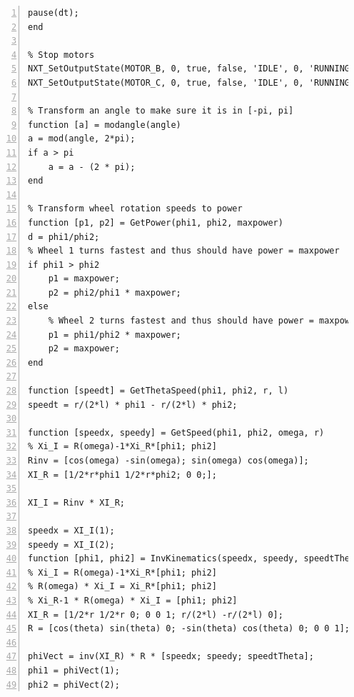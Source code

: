 \documentclass[a4paper]{article}
\begin{document}
\begin{lstlisting}[caption= Kinematica met feedback code, label=lst:bocht, numbers=left]
	pause(dt);
end

% Stop motors
NXT_SetOutputState(MOTOR_B, 0, true, false, 'IDLE', 0, 'RUNNING',  0, 'dontreply');
NXT_SetOutputState(MOTOR_C, 0, true, false, 'IDLE', 0, 'RUNNING',  0, 'dontreply');

% Transform an angle to make sure it is in [-pi, pi]
function [a] = modangle(angle)
a = mod(angle, 2*pi);
if a > pi
    a = a - (2 * pi);
end

% Transform wheel rotation speeds to power
function [p1, p2] = GetPower(phi1, phi2, maxpower)
d = phi1/phi2;
% Wheel 1 turns fastest and thus should have power = maxpower
if phi1 > phi2
	p1 = maxpower;
	p2 = phi2/phi1 * maxpower;
else
    % Wheel 2 turns fastest and thus should have power = maxpower
	p1 = phi1/phi2 * maxpower;
	p2 = maxpower;
end

function [speedt] = GetThetaSpeed(phi1, phi2, r, l)
speedt = r/(2*l) * phi1 - r/(2*l) * phi2;

function [speedx, speedy] = GetSpeed(phi1, phi2, omega, r)
% Xi_I = R(omega)-1*Xi_R*[phi1; phi2]
Rinv = [cos(omega) -sin(omega); sin(omega) cos(omega)];
XI_R = [1/2*r*phi1 1/2*r*phi2; 0 0;];

XI_I = Rinv * XI_R;

speedx = XI_I(1);
speedy = XI_I(2);
function [phi1, phi2] = InvKinematics(speedx, speedy, speedtTheta, theta, r, l)
% Xi_I = R(omega)-1*Xi_R*[phi1; phi2]
% R(omega) * Xi_I = Xi_R*[phi1; phi2]
% Xi_R-1 * R(omega) * Xi_I = [phi1; phi2]
XI_R = [1/2*r 1/2*r 0; 0 0 1; r/(2*l) -r/(2*l) 0];
R = [cos(theta) sin(theta) 0; -sin(theta) cos(theta) 0; 0 0 1];

phiVect = inv(XI_R) * R * [speedx; speedy; speedtTheta];
phi1 = phiVect(1);
phi2 = phiVect(2);
\end{lstlisting}
\end{document}
